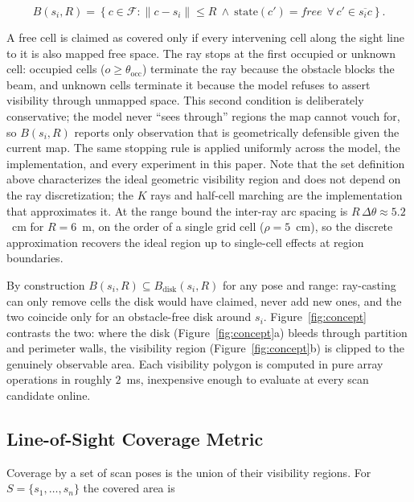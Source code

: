 \documentclass[sensors,article,submit,pdftex,moreauthors]{Definitions/mdpi}
\providecommand{\DIFadd}[1]{{\protect\color{blue} \sf #1}} %
\providecommand{\DIFaddbegin}{} %
\providecommand{\DIFaddend}{} %
\begin{document}
\begin{equation}
B(s_i,R)=\left\{c\in\mathcal{F}:
\lVert c-s_i\rVert \le R \ \wedge\
\mathrm{state}(c')=\textit{free}\ \ \forall\, c'\in\overline{s_i c}\right\}.
\end{equation}

A free cell is claimed as covered only if every intervening cell along the sight
line to it is also mapped free space. The ray stops at the first occupied or
unknown cell: occupied cells ($o\ge\theta_{\mathrm{occ}}$) terminate the ray
because the obstacle blocks the beam, and unknown cells terminate it because the
model refuses to assert visibility through unmapped space. This second condition
is deliberately conservative; the model never ``sees through'' regions the map
cannot vouch for, so $B(s_i,R)$ reports only observation that is geometrically
defensible given the current map. The same stopping rule is applied uniformly
across the model, the implementation, and every experiment in this paper.
\DIFaddbegin \DIFadd{Note that the set definition above characterizes the ideal geometric
visibility region and does not depend on the ray discretization; the $K$ rays
and half-cell marching are the implementation that approximates it. At the
range bound the inter-ray arc spacing is $R\,\Delta\theta\approx5.2$~cm for
$R=6$~m, on the order of a single grid cell ($\rho=5$~cm), so the discrete
approximation recovers the ideal region up to single-cell effects at region
boundaries.
}\DIFaddend 

By construction $B(s_i,R)\subseteq B_{\mathrm{disk}}(s_i,R)$ for any pose and
range: ray-casting can only remove cells the disk would have claimed, never add
new ones, and the two coincide only for an obstacle-free disk around $s_i$.
Figure~\ref{fig:concept} contrasts the two: where the disk
(Figure~\ref{fig:concept}a) bleeds through partition and perimeter walls, the
visibility region (Figure~\ref{fig:concept}b) is clipped to the genuinely
observable area. Each visibility polygon is computed in pure array operations in
roughly $2$~ms, inexpensive enough to evaluate at every scan candidate online.

\subsection{Line-of-Sight Coverage Metric}
\label{sec:los}

Coverage by a set of scan poses is the union of their visibility regions. For
$S=\{s_1,\dots,s_n\}$ the covered area is
\end{document}
